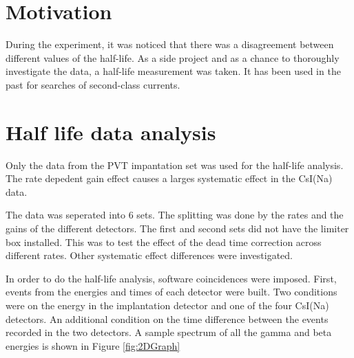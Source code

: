 

\section{Motivation}
During the experiment, it was noticed that there was a disagreement between different values of the half-life.
As a side project and as a chance to thoroughly investigate the data, a half-life measurement was taken. 
It has been used in the past for searches of second-class currents.


\section{Half life data analysis}
\label{sec:analysis}

Only the data from the PVT impantation set was used for the half-life analysis.
The rate depedent gain effect causes a larges systematic effect in the CsI(Na) data.

The data was seperated into 6 sets.
The splitting was done by the rates and the gains of the different detectors.
The first and second sets did not have the limiter box installed.
This was to test the effect of the dead time correction across different rates.
Other systematic effect differences were investigated.

In order to do the half-life analysis, software coincidences were imposed.
First, events from the energies and times of each detector were built.
Two conditions were on the energy in the implantation detector and one of the four CsI(Na) detectors.
An additional condition on the time difference between the events recorded in the two detectors. 
A sample spectrum of all the gamma and beta energies is shown in Figure \ref{fig:2DGraph}  

